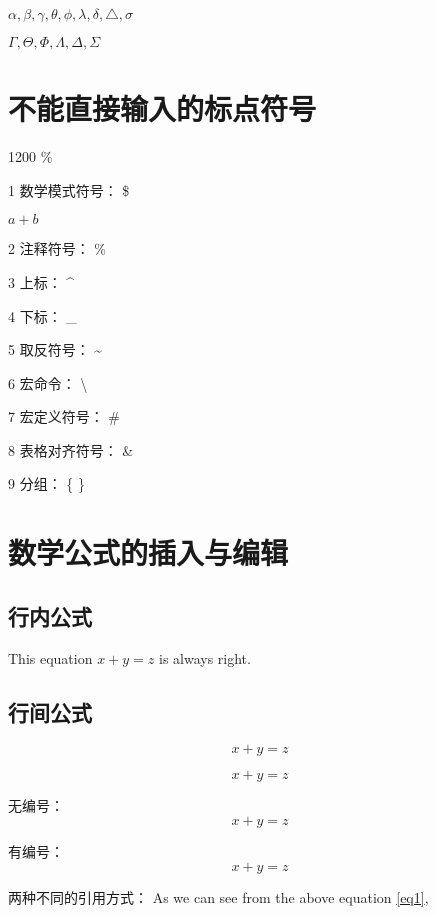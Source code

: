 \documentclass[12pt]{elegantpaper} %
\numberwithin{equation}{section}
\begin{document}
$\alpha, \beta, \gamma, \theta, \phi, \lambda, \delta, \triangle, \sigma$

$\Gamma, \Theta, \Phi, \Lambda, \Delta, \Sigma$

\section{不能直接输入的标点符号}

1200 \%

1 数学模式符号：
\$

$a+b$

2 注释符号：
\%

3 上标：
\^{}

4 下标：
\_

5 取反符号：
\~{}

6 宏命令：
\textbackslash

7 宏定义符号：
\#

8 表格对齐符号：
\&

9 分组：
\{ \}



\section{数学公式的插入与编辑}


\subsection{行内公式}
This equation $x + y = z$ is always right.





\subsection{行间公式}

$$x+y=z$$


\[x+y=z\]


无编号：
\begin{equation*}
x+y=z
\end{equation*}


有编号：
\begin{equation}
\label{eq1}
x+y=z
\end{equation}



两种不同的引用方式：
As we can see from the above equation \ref{eq1}, 
\end{document}
